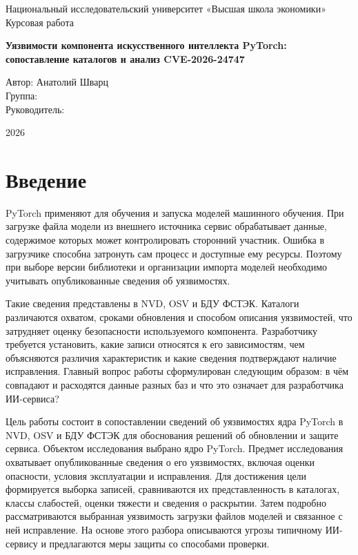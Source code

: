 \documentclass[12pt,a4paper]{report}
\begin{document}
\begin{titlepage}
\begin{center}
Национальный исследовательский университет «Высшая школа экономики»\\
\vspace{2cm}
Курсовая работа\\[0.7cm]
{\Large\bfseries Уязвимости компонента искусственного интеллекта PyTorch:\\
сопоставление каталогов и анализ CVE-2026-24747\par}
\end{center}
\vfill
\begin{flushright}
Автор: Анатолий Шварц\\
Группа: \underline{\hspace{4cm}}\\
Руководитель: \underline{\hspace{4cm}}
\end{flushright}
\vfill
\begin{center}
2026
\end{center}
\end{titlepage}

\tableofcontents
\clearpage

\chapter*{Введение}

PyTorch применяют для обучения и запуска моделей машинного обучения. При загрузке файла модели из внешнего источника сервис обрабатывает данные, содержимое которых может контролировать сторонний участник. Ошибка в загрузчике способна затронуть сам процесс и доступные ему ресурсы. Поэтому при выборе версии библиотеки и организации импорта моделей необходимо учитывать опубликованные сведения об уязвимостях.

Такие сведения представлены в NVD, OSV и БДУ ФСТЭК. Каталоги различаются охватом, сроками обновления и способом описания уязвимостей, что затрудняет оценку безопасности используемого компонента. Разработчику требуется установить, какие записи относятся к его зависимостям, чем объясняются различия характеристик и какие сведения подтверждают наличие исправления. Главный вопрос работы сформулирован следующим образом: в чём совпадают и расходятся данные разных баз и что это означает для разработчика ИИ-сервиса?

Цель работы состоит в сопоставлении сведений об уязвимостях ядра PyTorch в NVD, OSV и БДУ ФСТЭК для обоснования решений об обновлении и защите сервиса. Объектом исследования выбрано ядро PyTorch. Предмет исследования охватывает опубликованные сведения о его уязвимостях, включая оценки опасности, условия эксплуатации и исправления. Для достижения цели формируется выборка записей, сравниваются их представленность в каталогах, классы слабостей, оценки тяжести и сведения о раскрытии. Затем подробно рассматриваются выбранная уязвимость загрузки файлов моделей и связанное с ней исправление. На основе этого разбора описываются угрозы типичному ИИ-сервису и предлагаются меры защиты со способами проверки.
\end{document}
